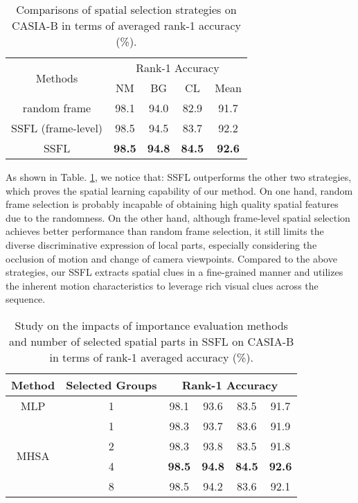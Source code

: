 \documentclass[journal]{IEEEtran}
\begin{document}
\begin{table}[ht]
    \centering
    \caption{Comparisons of spatial selection strategies on CASIA-B in terms of averaged rank-1 accuracy (\%).}
    \begin{tabular}{|c|c|c|c|c|}
    \hline
    \multirow{2}{*}{Methods} & \multicolumn{4}{c|}{Rank-1 Accuracy} \\\cline{2-5}
    & NM & BG & CL & Mean \\\hline
    random frame & 98.1 & 94.0 & 82.9 & 91.7 \\\hline
    SSFL (frame-level) & 98.5 & 94.5 & 83.7 & 92.2 \\\hline
    SSFL & \textbf{98.5} & \textbf{94.8} & \textbf{84.5} & \textbf{92.6} \\\hline
    \end{tabular}
    \label{tab: spatial selection}
\end{table}

As shown in Table. \ref{tab: spatial selection}, we notice that: SSFL outperforms the other two strategies, which proves the spatial learning capability of our method. On one hand, random frame selection is probably incapable of obtaining high quality spatial features due to the randomness. On the other hand, although frame-level spatial selection achieves better performance than random frame selection, it still limits the diverse discriminative expression of local parts, especially considering the occlusion of motion and change of camera viewpoints. Compared to the above strategies, our SSFL extracts spatial clues in a fine-grained manner and utilizes the inherent motion characteristics to leverage rich visual clues across the sequence.

\begin{table}[ht]
    \centering
    \caption{Study on the impacts of importance evaluation methods and number of selected spatial parts in SSFL on CASIA-B in terms of rank-1 averaged accuracy (\%).}
    \begin{tabular}{|c|c|c|c|c|c|}
        \hline
        Method & Selected Groups & \multicolumn{4}{c|}{Rank-1 Accuracy}  \\\hline
        MLP & 1 & 98.1 & 93.6 & 83.5 & 91.7 \\\hline
        \multirow{4}{*}{MHSA} & 1 & 98.3 & 93.7 & 83.6 & 91.9 \\\cline{2-6}
        & 2 & 98.3 & 93.8 & 83.5 & 91.8 \\\cline{2-6}
        & 4 & \textbf{98.5} & \textbf{94.8} & \textbf{84.5} & \textbf{92.6} \\\cline{2-6}
        & 8 & 98.5 & 94.2 & 83.6 & 92.1 \\\hline
    \end{tabular}
    \label{tab:importance evaluation}
\end{table}
\end{document}

